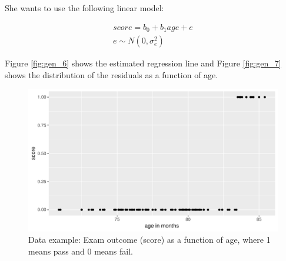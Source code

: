 \documentclass[]{book}\usepackage[]{graphicx}\usepackage[]{color}
\makeatletter
\def\maxwidth{ %
  \ifdim\Gin@nat@width>\linewidth
    \linewidth
  \else
    \Gin@nat@width
  \fi
}
\newenvironment{knitrout}{}{} %
\makeatother
\begin{document}
She wants to use the following linear model:

\begin{eqnarray}
score = b_0 + b_1 age  + e \\
e \sim N(0, \sigma_e^2)
\end{eqnarray}

Figure \ref{fig:gen_6} shows the estimated regression line and Figure \ref{fig:gen_7} shows the distribution of the residuals as a function of age.


\begin{knitrout}
\color{fgcolor}\begin{figure}

{\centering \includegraphics[width=\maxwidth]{figure/gen_5-1} 

}

\caption[Data example]{Data example: Exam outcome (score) as a function of age, where 1 means pass and 0 means fail.}\label{fig:gen_5}
\end{figure}


\end{knitrout}
\end{document}
